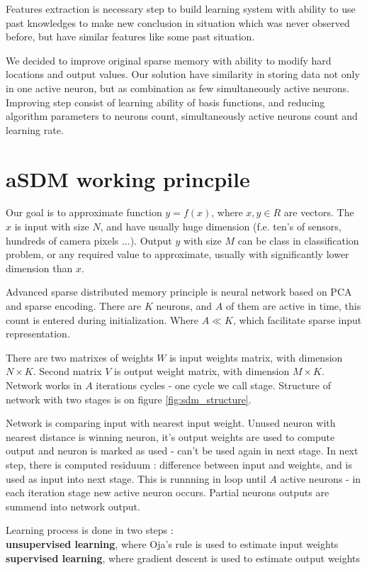 \documentclass[10pt,a4paper]{article}
\begin{document}
Features extraction is necessary step to build learning system with ability to use past knowledges to make new conclusion
in situation which was never observed before, but have similar features like some past situation.

We decided to improve original sparse memory with ability to modify hard locations and output values. Our
solution have similarity in storing data not only in one active neuron, but as combination as few simultaneously active
neurons. Improving step consist of learning ability of basis functions, and reducing algorithm parameters to
neurons count, simultaneously active neurons count and learning rate.

\section{aSDM working princpile}

Our goal is to approximate function $y = f(x)$, where $x,y \in \!R$ are vectors.
The $x$ is input with size $N$, and have usually huge dimension (f.e. ten's of sensors, hundreds of camera pixels ...).
Output $y$ with size $M$ can be class in classification problem, or any required value to approximate, usually with
significantly lower dimension than $x$.

Advanced sparse distributed memory principle is neural network based on PCA and sparse encoding. There are $K$ neurons,
and $A$ of them are active in time, this count is entered during initialization. Where $A \ll K$, which
facilitate sparse input representation.

There are two matrixes of weights $W$ is input weights matrix, with dimension $N \times K$.
Second matrix $V$ is output weight matrix, with dimension $M \times K$. Network works in $A$
iterations cycles - one cycle we call stage. Structure of network with two stages is on figure \ref{fig:sdm_structure}.

Network is comparing input with nearest input weight. Unused neuron with nearest distance is winning neuron,
it's output weights are used to compute output and neuron is marked as used - can't be used again in next stage.
In next step, there is computed residuum : difference between input and weights, and is used as input into next stage. This is runnning in loop until $A$
active neurons - in each iteration stage new active neuron occurs. Partial neurons outputs are summend into network output.

Learning process is done in two steps : \\
{\bf unsupervised learning}, where Oja's rule is used to estimate input weights \\
{\bf supervised learning}, where gradient descent is used to estimate output weights \\
\end{document}
